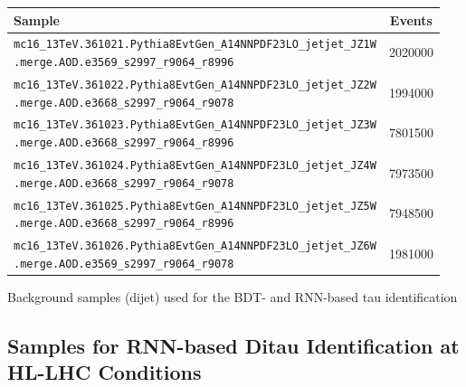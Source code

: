 \vspace*{2em}

\noindent
\begin{minipage}{\textwidth}
  \captionsetup{type=table}
  \centering
  {\small
  \begin{tabular}{p{13cm}S[table-format=7.0]}
    \toprule
    Sample & {Events} \\
    \midrule
    \texttt{mc16\_13TeV.361021.Pythia8EvtGen\_A14NNPDF23LO\_jetjet\_JZ1W\newline\hspace*{1em}.merge.AOD.e3569\_s2997\_r9064\_r8996} & 2020000 \\
    \texttt{mc16\_13TeV.361022.Pythia8EvtGen\_A14NNPDF23LO\_jetjet\_JZ2W\newline\hspace*{1em}.merge.AOD.e3668\_s2997\_r9064\_r9078} & 1994000 \\
    \texttt{mc16\_13TeV.361023.Pythia8EvtGen\_A14NNPDF23LO\_jetjet\_JZ3W\newline\hspace*{1em}.merge.AOD.e3668\_s2997\_r9064\_r8996} & 7801500 \\
    \texttt{mc16\_13TeV.361024.Pythia8EvtGen\_A14NNPDF23LO\_jetjet\_JZ4W\newline\hspace*{1em}.merge.AOD.e3668\_s2997\_r9064\_r9078} & 7973500 \\
    \texttt{mc16\_13TeV.361025.Pythia8EvtGen\_A14NNPDF23LO\_jetjet\_JZ5W\newline\hspace*{1em}.merge.AOD.e3668\_s2997\_r9064\_r8996} & 7948500 \\
    \texttt{mc16\_13TeV.361026.Pythia8EvtGen\_A14NNPDF23LO\_jetjet\_JZ6W\newline\hspace*{1em}.merge.AOD.e3569\_s2997\_r9064\_r9078} & 1981000 \\
    \bottomrule
  \end{tabular}
  }
  \caption[Background samples used for the BDT- and RNN-based tau
  identification]{Background samples (dijet) used for the BDT- and RNN-based tau
    identification}
  \label{tab:samples_preprod_dijets}
\end{minipage}

\clearpage
\subsection{Samples for RNN-based Ditau Identification at HL-LHC Conditions}
\label{app:upgrade_samples}

